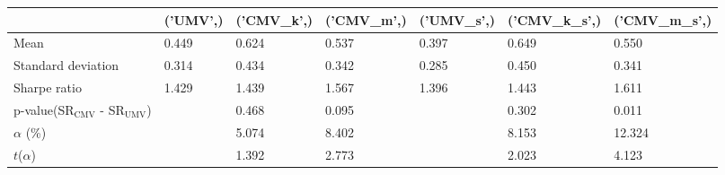 \begin{tabular}{lllllll}
\toprule
 & ('UMV',) & ('CMV_k',) & ('CMV_m',) & ('UMV_s',) & ('CMV_k_s',) & ('CMV_m_s',) \\
\midrule
Mean & 0.449 & 0.624 & 0.537 & 0.397 & 0.649 & 0.550 \\
Standard deviation & 0.314 & 0.434 & 0.342 & 0.285 & 0.450 & 0.341 \\
Sharpe ratio & 1.429 & 1.439 & 1.567 & 1.396 & 1.443 & 1.611 \\
p-value(SR$_{\text{CMV}}$ - SR$_{\text{UMV}}$) &  & 0.468 & 0.095 &  & 0.302 & 0.011 \\
$\alpha$ (\%) &  & 5.074 & 8.402 &  & 8.153 & 12.324 \\
$t$($\alpha$) &  & 1.392 & 2.773 &  & 2.023 & 4.123 \\
\bottomrule
\end{tabular}
